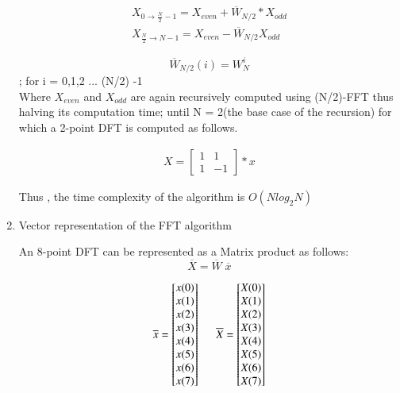 \documentclass[journal,12pt,twocolumn]{IEEEtran}
\renewcommand\thesection{\arabic{section}}
\begin{document}
\begin{enumerate}[label=\thesection.\arabic*.,ref=\thesection.\theenumi]
\begin{align}
    X_{0\rightarrow \frac{N}{2}-1} = X_{even} + \overline{W}_{N/2}* X_{odd} \\
    X_{\frac{N}{2}\rightarrow N-1} = X_{even} - \overline{W}_{N/2} X_{odd} 
\end{align}

 $$\overline{W}_{N/2}(i) = W_{N}^i $$;  for i = 0,1,2 ... (N/2) -1 \bigskip\\
 
 Where $ X_{even}$ and $X_{odd}$ are again recursively computed using (N/2)-FFT thus halving its computation time;
until N = 2(the base case of the recursion) for which a 2-point DFT is computed as follows.

\begin{align}
    X = 
    \begin{bmatrix}
    1 & 1\\
    1& -1
    \end{bmatrix} * x
\end{align}

Thus , the time complexity of the algorithm is $O(Nlog_{2}N)$\bigskip

\item Vector representation of the FFT algorithm

An 8-point DFT can be represented as a Matrix product as follows:
$$\overline{X} = \overline{W}\;  \overline{x}$$

\begin{equation}
  \overline{x} =
\begin{bmatrix}
x(0) \\ x(1) \\ x(2) \\ x(3) \\ x(4) \\ x(5) \\x(6) \\x(7)
\end{bmatrix}  \hspace{5mm} \overline{X} =
\begin{bmatrix}
X(0) \\X(1) \\X(2) \\X(3) \\X(4) \\X(5) \\X(6) \\X(7) \\
\end{bmatrix} 
\end{equation}


\end{enumerate}
\end{document}
